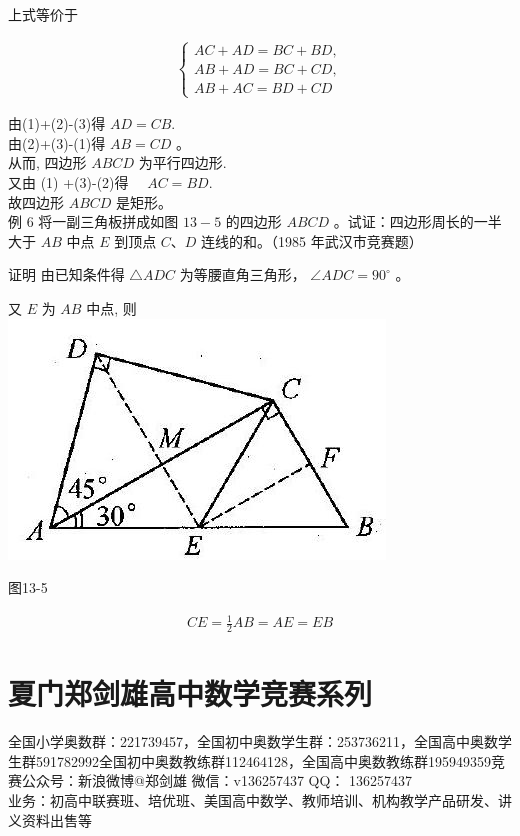 \documentclass[10pt]{article}
\begin{document}
上式等价于

\begin{align*}
\left\{\begin{array}{l}
A C+A D=B C+B D,  \tag{1}\\
A B+A D=B C+C D, \\
A B+A C=B D+C D
\end{array}\right.
\end{align*}

由(1)+(2)-(3)得 $A D=C B$.\\
由(2)+(3)-(1)得 $A B=C D$ 。\\
从而, 四边形 $A B C D$ 为平行四边形.\\
又由 (1) +(3)-(2)得 $\quad A C=B D$.\\
故四边形 $A B C D$ 是矩形。\\
例 6 将一副三角板拼成如图 $13-5$ 的四边形 $A B C D$ 。试证：四边形周长的一半大于 $A B$ 中点 $E$ 到顶点 $C 、 D$ 连线的和。（1985 年武汉市竞赛题）

证明 由已知条件得 $\triangle A D C$ 为等腰直角三角形， $\angle A D C=90^{\circ}$ 。

又 $E$ 为 $A B$ 中点, 则\\
\includegraphics[max width=\textwidth, center]{2024_10_30_2c8f45efd4a519b08e1ag-122}

图13-5

\begin{align*}
C E=\frac{1}{2} A B=A E=E B
\end{align*}

\section*{夏门郑剑雄高中数学竞赛系列}
全国小学奥数群：221739457，全国初中奥数学生群：253736211，全国高中奥数学生群591782992全国初中奥数教练群112464128，全国高中奥数教练群195949359竞赛公众号：新浪微博@郑剑雄 微信：v136257437 QQ： 136257437\\
业务：初高中联赛班、培优班、美国高中数学、教师培训、机构教学产品研发、讲义资料出售等
\end{document}

